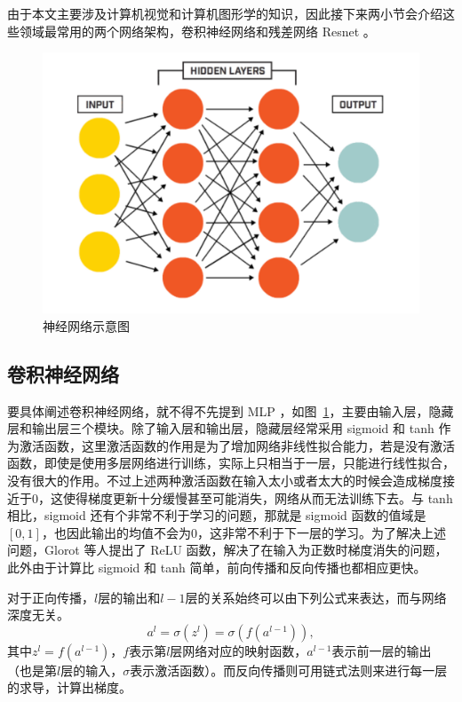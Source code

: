 由于本文主要涉及计算机视觉和计算机图形学的知识，因此接下来两小节会介绍这些领域最常用的两个网络架构，卷积神经网络和残差网络 Resnet 。

\begin{figure}[t]
  \centering
  \includegraphics[width=0.9\linewidth]{figures/fc.png}
  \caption{神经网络示意图}
  \label{fig:neuralNetwork}
\end{figure}

\subsection{卷积神经网络}
要具体阐述卷积神经网络，就不得不先提到 MLP ，如图~\ref{fig:neuralNetwork}，主要由输入层，隐藏层和输出层三个模块。除了输入层和输出层，隐藏层经常采用 sigmoid 和 tanh 作为激活函数，这里激活函数的作用是为了增加网络非线性拟合能力，若是没有激活函数，即使是使用多层网络进行训练，实际上只相当于一层，只能进行线性拟合，没有很大的作用。不过上述两种激活函数在输入太小或者太大的时候会造成梯度接近于0，这使得梯度更新十分缓慢甚至可能消失，网络从而无法训练下去。与 tanh 相比，sigmoid 还有个非常不利于学习的问题，那就是 sigmoid 函数的值域是$[0,1]$，也因此输出的均值不会为0，这非常不利于下一层的学习。为了解决上述问题，Glorot 等人\cite{glorot2011deep}提出了 ReLU 函数，解决了在输入为正数时梯度消失的问题，此外由于计算比 sigmoid 和 tanh 简单，前向传播和反向传播也都相应更快。

对于正向传播，$l$层的输出和$l-1$层的关系始终可以由下列公式来表达，而与网络深度无关。
\begin{equation}
    a^{l} = \sigma(z^{l}) = \sigma(f(a^{l-1})),
\end{equation}
其中$z^l = f(a^{l-1})$，$f$表示第$l$层网络对应的映射函数，$a^{l-1}$表示前一层的输出（也是第$l$层的输入，$\sigma$表示激活函数）。而反向传播则可用链式法则来进行每一层的求导，计算出梯度。


